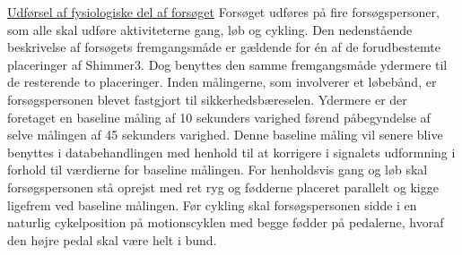 \underline{Udførsel af fysiologiske del af forsøget}
Forsøget udføres på fire forsøgspersoner, som alle skal udføre aktiviteterne gang, løb og cykling. Den nedenstående beskrivelse af forsøgets fremgangsmåde er gældende for én af de forudbestemte placeringer af Shimmer3. Dog benyttes den samme fremgangsmåde ydermere til de resterende to placeringer. \newline
 Inden målingerne, som involverer et løbebånd, er forsøgspersonen blevet fastgjort til sikkerhedsbæreselen. Ydermere er der foretaget en baseline måling af 10 sekunders varighed førend påbegyndelse af selve målingen af 45 sekunders varighed. Denne baseline måling vil senere blive benyttes i databehandlingen med henhold til at korrigere i signalets udformning i forhold til værdierne for baseline målingen. \newline
For henholdsvis gang og løb skal forsøgspersonen stå oprejst med ret ryg og fødderne placeret parallelt og kigge ligefrem ved baseline målingen. Før cykling skal forsøgspersonen sidde i en naturlig cykelposition på motionscyklen med begge fødder på pedalerne, hvoraf den højre pedal skal være helt i bund. \newline

